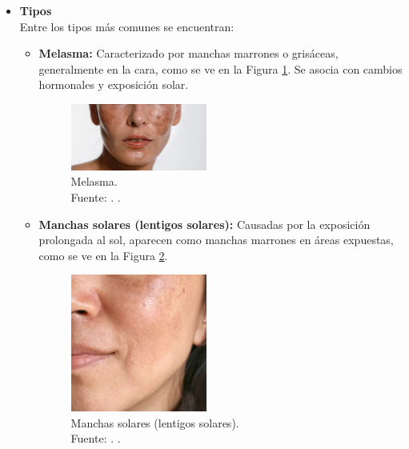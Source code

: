 \begin{itemize}
	\item \textbf{Tipos}\\
Entre los tipos más comunes se encuentran:
\begin{itemize}
\item \textbf{Melasma:} Caracterizado por manchas marrones o grisáceas, generalmente en la cara, como se ve en la Figura \ref{2:melasma}. Se asocia con cambios hormonales y exposición solar. \parencite{lee2024pigmentary}

\begin{figure}[H]
		\begin{center}
			\includegraphics[width=0.45\textwidth]{2/figures/melasma.png}
			\caption[Melasma]{Melasma.\\
			Fuente: \cite{consejosiml}. .}
			\label{2:melasma}
		\end{center}
	\end{figure}

\item \textbf{Manchas solares (lentigos solares):} Causadas por la exposición prolongada al sol, aparecen como manchas marrones en áreas expuestas, como se ve en la Figura \ref{2:mansol}. \parencite{lee2024pigmentary}

\begin{figure}[H]
		\begin{center}
			\includegraphics[width=0.45\textwidth]{2/figures/manchas solares.png}
			\caption[Manchas solares (lentigos solares)]{Manchas solares (lentigos solares).\\
			Fuente: \cite{eauthermaleavene}. .}
			\label{2:mansol}
		\end{center}
	\end{figure}


\end{itemize}
\end{itemize}
